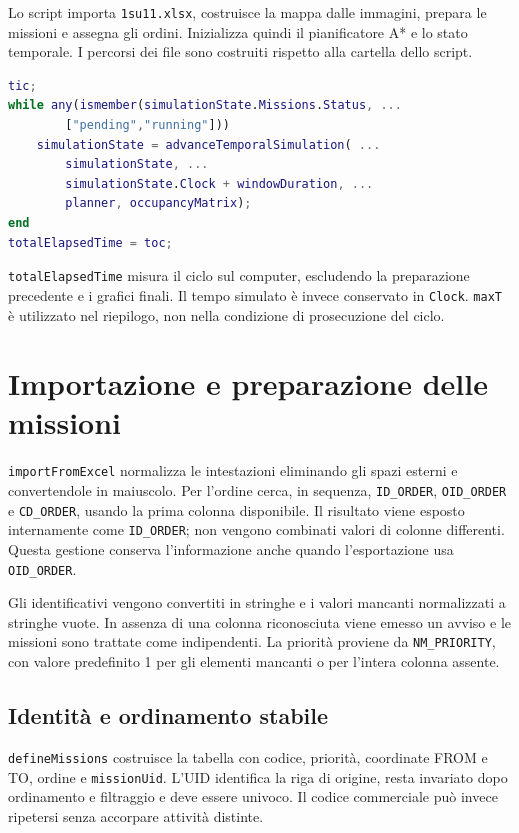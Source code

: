Lo script importa \texttt{1su11.xlsx}, costruisce la mappa dalle immagini,
prepara le missioni e assegna gli ordini. Inizializza quindi il pianificatore
A* e lo stato temporale. I percorsi dei file sono costruiti rispetto alla
cartella dello script.

\begin{lstlisting}[language=Matlab,caption={Avanzamento sullo stesso stato persistente.},label={lst:impl-ciclo}]
tic;
while any(ismember(simulationState.Missions.Status, ...
        ["pending","running"]))
    simulationState = advanceTemporalSimulation( ...
        simulationState, ...
        simulationState.Clock + windowDuration, ...
        planner, occupancyMatrix);
end
totalElapsedTime = toc;
\end{lstlisting}

\texttt{totalElapsedTime} misura il ciclo sul computer, escludendo la
preparazione precedente e i grafici finali. Il tempo simulato è invece
conservato in \texttt{Clock}. \texttt{maxT} è utilizzato nel riepilogo,
non nella condizione di prosecuzione del ciclo.

\section{Importazione e preparazione delle missioni}
\label{sec:impl-importazione}

\texttt{importFromExcel} normalizza le intestazioni eliminando gli spazi
esterni e convertendole in maiuscolo. Per l'ordine cerca, in sequenza,
\texttt{ID\_ORDER}, \texttt{OID\_ORDER} e \texttt{CD\_ORDER}, usando la
prima colonna disponibile. Il risultato viene esposto internamente come
\texttt{ID\_ORDER}; non vengono combinati valori di colonne differenti.
Questa gestione conserva l'informazione anche quando l'esportazione usa
\texttt{OID\_ORDER}.

Gli identificativi vengono convertiti in stringhe e i valori mancanti
normalizzati a stringhe vuote. In assenza di una colonna riconosciuta viene
emesso un avviso e le missioni sono trattate come indipendenti. La priorità
proviene da \texttt{NM\_PRIORITY}, con valore predefinito 1 per gli elementi
mancanti o per l'intera colonna assente.

\subsection{Identità e ordinamento stabile}

\texttt{defineMissions} costruisce la tabella con codice, priorità,
coordinate FROM e TO, ordine e \texttt{missionUid}. L'UID identifica la
riga di origine, resta invariato dopo ordinamento e filtraggio e deve essere
univoco. Il codice commerciale può invece ripetersi senza accorpare attività
distinte.

